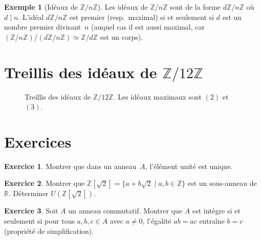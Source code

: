 \documentclass[12pt,a4paper,openany]{book}
\theoremstyle{definition}
\newtheorem{exemple}{Exemple}[chapter]
\newtheorem{exercice}{Exercice}[chapter]
\newcommand{\Z}{\mathbb{Z}}
\newcommand{\R}{\mathbb{R}}
\begin{document}
\begin{exemple}[Idéaux de $\Z/n\Z$]\label{ex:ideaux-ZnZ}
Les idéaux de $\Z/n\Z$ sont de la forme $d\Z/n\Z$ où $d \mid n$.
L'idéal $d\Z/n\Z$ est premier (resp.\ maximal) si et seulement si $d$ est
un nombre premier divisant~$n$ (auquel cas il est aussi maximal, car
$(\Z/n\Z)/(d\Z/n\Z) \simeq \Z/d\Z$ est un corps).
\end{exemple}

\section{Treillis des idéaux de $\Z/12\Z$}\label{sec:treillis-Z12Z}

\begin{figure}[ht]
\centering
{}
\caption{Treillis des idéaux de $\Z/12\Z$. Les idéaux maximaux
sont $(2)$ et $(3)$.}\label{fig:treillis-Z12Z}
\end{figure}

\section{Exercices}\label{sec:exo-anneaux}

\begin{exercice}\label{exo:ann-1}
Montrer que dans un anneau~$A$, l'élément unité est unique.
\end{exercice}

\begin{exercice}\label{exo:ann-2}
Montrer que $\Z[\sqrt{2}] = \{a + b\sqrt{2} \mid a, b \in \Z\}$ est un
sous-anneau de~$\R$. Déterminer $U(\Z[\sqrt{2}])$.
\end{exercice}

\begin{exercice}\label{exo:ann-3}
Soit $A$ un anneau commutatif. Montrer que $A$ est intègre si et seulement
si pour tous $a, b, c \in A$ avec $a \neq 0$, l'égalité $ab = ac$ entraîne
$b = c$ (propriété de simplification).
\end{exercice}
\end{document}
